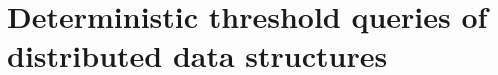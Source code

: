 \chapter{Deterministic threshold queries of distributed data structures}\label{ch:distributed} %










